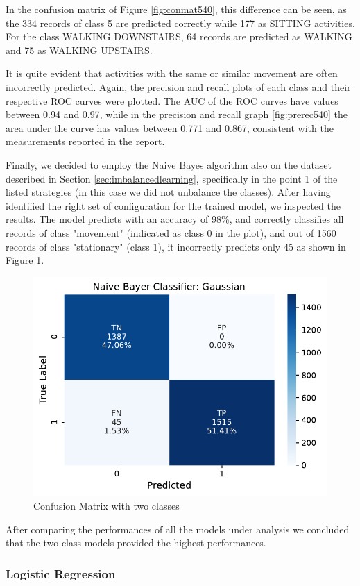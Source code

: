 \documentclass[10pt, a4paper, twocolumn]{article}
\begin{document}
In the confusion matrix of Figure \ref{fig:conmat540}, this difference can be seen, as the 334 records of class 5 are predicted correctly while 177 as SITTING activities. For the class WALKING DOWNSTAIRS, 64 records are predicted as WALKING and 75 as WALKING UPSTAIRS. 

It is quite evident that activities with the same or similar movement are often incorrectly predicted. 
Again, the precision and recall plots of each class and their respective ROC curves were plotted. The AUC of the ROC curves have values between 0.94 and 0.97, while in the precision and recall graph \ref{fig:prerec540} the area under the curve has values between 0.771 and 0.867, consistent with the measurements reported in the report.

Finally, we decided to employ the Naive Bayes algorithm also on the dataset described in Section \ref{sec:imbalancedlearning}, specifically in the point 1 of the listed strategies (in this case we did not unbalance the classes). After having identified the right set of configuration for the trained model, we inspected the results. The model predicts with an accuracy of 98\%, and correctly classifies all records of class "movement" (indicated as class 0 in the plot), and out of 1560 records of class "stationary" (class 1), it incorrectly predicts only 45 as shown in Figure \ref{fig:conmat2}.

\begin{figure}
    \centering
    \includegraphics[width=0.5\columnwidth]{immagini Lia/confu_2_classi.pdf}
    \caption{Confusion Matrix with two classes}
    \label{fig:conmat2}
\end{figure}


After comparing the performances of all the models under analysis we concluded that the two-class models provided the highest performances. 


\subsubsection*{Logistic Regression}
\end{document}

